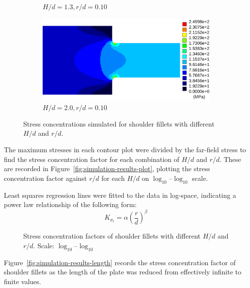 \documentclass[a4paper,11pt,twocolumn]{article}
\begin{document}
\begin{figure}[t]
\begin{subfigure}[b]{0.48\textwidth}
        \caption{$H/d = 1.3,r/d = 0.10$}
        \label{fig:H/d=1.3-r/d=0.10}
    \end{subfigure}
    \begin{subfigure}[b]{0.48\textwidth}
        \includegraphics[width=\textwidth]{img/Hd2-0_rd0-10.pdf}
        \caption{$H/d = 2.0,r/d = 0.10$}
        \label{fig:H/d=2.0-r/d=0.10}
    \end{subfigure}
    \caption{Stress concentrations simulated for shoulder fillets with
        different $H/d$ and $r/d$.}
    \label{fig:simulation-results-contour}
\end{figure}

The maximum stresses in each contour plot were divided by the far-field stress 
to find the stress concentration factor for each combination of $H/d$ and
$r/d$. These are recorded in Figure~\vref{fig:simulation-results-plot}, plotting
the stress concentration factor against $r/d$ for each $H/d$ on 
$\log_{10}$--$\log_{10}$ scale.

Least squares regression lines were fitted to the data in log-space, indicating
a power law relationship of the following form:
\begin{equation}
    K_{\sigma_t} = \alpha\left(\frac{r}{d}\right)^\beta
\end{equation}

\begin{figure}[H]
    \small
    \centering
    \def\svgwidth{\linewidth}
    
    \caption{Stress concentration factors of shoulder fillets with
        different $H/d$ and $r/d$. Scale: $\log_{10}$--$\log_{10}$}
    \label{fig:simulation-results-plot}
\end{figure}

Figure~\ref{fig:simulation-results-length} records the stress concentration
factor of shoulder fillets as the length of the plate was reduced from
effectively infinite to finite values.
\end{document}
